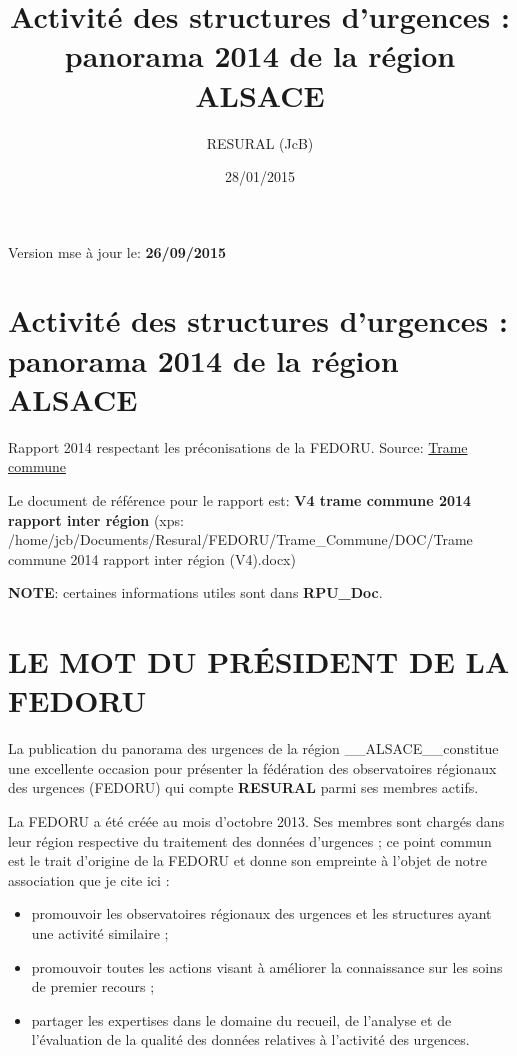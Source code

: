 \documentclass[]{article}
\title{Activité des structures d'urgences : panorama 2014 de la région ALSACE}
\author{RESURAL (JcB)}
\date{28/01/2015}
\begin{document}
\maketitle


{
\hypersetup{linkcolor=black}
\setcounter{tocdepth}{3}
\tableofcontents
}
Version mse à jour le: \textbf{26/09/2015}

\section{Activité des structures d'urgences : panorama 2014 de la région
ALSACE}\label{activite-des-structures-durgences-panorama-2014-de-la-region-alsace}

Rapport 2014 respectant les préconisations de la FEDORU. Source:
\href{https://docs.google.com/document/d/101LYVqVLeHZnrujfMm3aqBYfbOwx3CPEB3Y-Lbud2Ls/edit}{Trame
commune}

Le document de référence pour le rapport est: \textbf{V4 trame commune
2014 rapport inter région} (xps:
/home/jcb/Documents/Resural/FEDORU/Trame\_Commune/DOC/Trame commune 2014
rapport inter région (V4).docx)

\textbf{NOTE}: certaines informations utiles sont dans
\textbf{RPU\_Doc}.

\section{LE MOT DU PRÉSIDENT DE LA
FEDORU}\label{le-mot-du-president-de-la-fedoru}

La publication du panorama des urgences de la région
\_\_ALSACE\_\_constitue une excellente occasion pour présenter la
fédération des observatoires régionaux des urgences (FEDORU) qui compte
\textbf{RESURAL} parmi ses membres actifs.

La FEDORU a été créée au mois d'octobre 2013. Ses membres sont chargés
dans leur région respective du traitement des données d'urgences ; ce
point commun est le trait d'origine de la FEDORU et donne son empreinte
à l'objet de notre association que je cite ici :

\begin{itemize}
\itemsep1pt\parskip0pt
\item
  promouvoir les observatoires régionaux des urgences et les structures
  ayant une activité similaire ;
\item
  promouvoir toutes les actions visant à améliorer la connaissance sur
  les soins de premier recours ;
\item
  partager les expertises dans le domaine du recueil, de l'analyse et de
  l'évaluation de la qualité des données relatives à l'activité des
  urgences.
\end{itemize}
\end{document}

